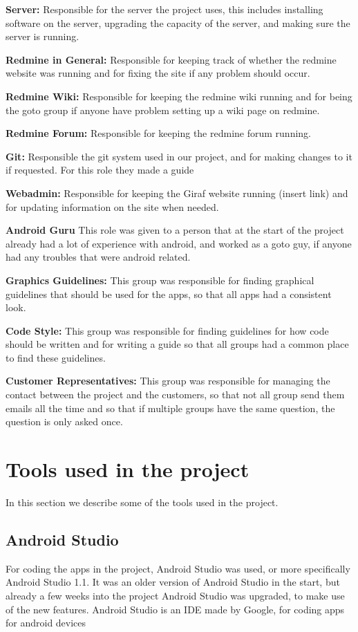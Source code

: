 \textbf{Server:}
Responsible for the server the project uses, this includes installing software on the server, upgrading the capacity of the server, and making sure the server is running.

\textbf{Redmine in General:}
Responsible for keeping track of whether the redmine website was running and for fixing the site if any problem should occur.

\textbf{Redmine Wiki:}
Responsible for keeping the redmine wiki running and for being the goto group if anyone have problem setting up a wiki page on redmine.

\textbf{Redmine Forum:}
Responsible for keeping the redmine forum running.
 
\textbf{Git:}
Responsible the git system used in our project, and for making changes to it if requested. For this role they made a guide

\textbf{Webadmin:}
Responsible for keeping the Giraf website running (insert link) and for updating information on the site when needed.

\textbf{Android Guru}
This role was given to a person that at the start of the project already had a lot of experience with android, and worked as a goto guy, if anyone had any troubles that were android related.

\textbf{Graphics Guidelines:}
This group was responsible for finding graphical guidelines that should be used for the apps, so that all apps had a consistent look.

\textbf{Code Style:}
This group was responsible for finding guidelines for how code should be written and for writing a guide so that all groups had a common place to find these guidelines.


\textbf{Customer Representatives:}
This group was responsible for managing the contact between the project and the customers, so that not all group send them emails all the time and so that if multiple groups have the same question, the question is only asked once.


\section{Tools used in the project}
In this section we describe some of the tools used in the project.

\subsection{Android Studio}
For coding the apps in the project, Android Studio was used, or more specifically Android Studio 1.1. It was an older version of Android Studio in the start, but already a few weeks into the project Android Studio was upgraded, to make use of the new features. Android Studio is an IDE made by Google, for coding apps for android devices \citep{AndroidStudio}

